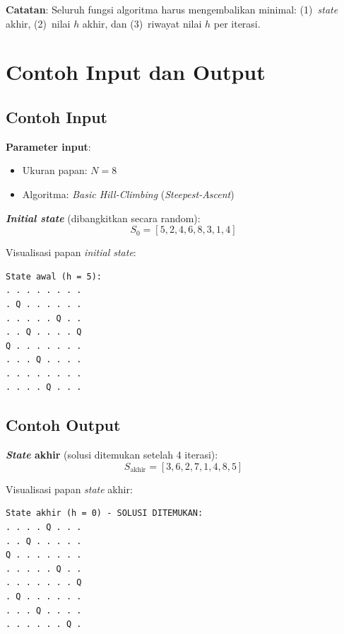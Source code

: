\documentclass[12pt,a4paper]{article}
\begin{document}
\textbf{Catatan}: Seluruh fungsi algoritma harus mengembalikan minimal: (1)~\textit{state} akhir, (2)~nilai $h$ akhir, dan (3)~riwayat nilai $h$ per iterasi.

\section{Contoh Input dan Output}
\label{sec:contoh-io}

\subsection{Contoh Input}
\label{subsec:contoh-input}

\textbf{Parameter input}:
\begin{itemize}
    \item Ukuran papan: $N = 8$
    \item Algoritma: \textit{Basic Hill-Climbing} (\textit{Steepest-Ascent})
\end{itemize}

\textbf{\textit{Initial state}} (dibangkitkan secara random):
\[
    S_0 = [5, 2, 4, 6, 8, 3, 1, 4]
\]

Visualisasi papan \textit{initial state}:
\begin{lstlisting}[language={}, basicstyle=\ttfamily\small, frame=single, caption={Visualisasi \textit{initial state} $S_0 = \lbrack 5, 2, 4, 6, 8, 3, 1, 4 \rbrack$.}]
State awal (h = 5):
. . . . . . . .
. Q . . . . . .
. . . . . Q . .
. . Q . . . . Q
Q . . . . . . .
. . . Q . . . .
. . . . . . . .
. . . . Q . . .
\end{lstlisting}

\subsection{Contoh Output}
\label{subsec:contoh-output}

\textbf{\textit{State} akhir} (solusi ditemukan setelah 4 iterasi):
\[
    S_{\text{akhir}} = [3, 6, 2, 7, 1, 4, 8, 5]
\]

Visualisasi papan \textit{state} akhir:
\begin{lstlisting}[language={}, basicstyle=\ttfamily\small, frame=single, caption={Visualisasi \textit{final state} $S_{akhir} = \lbrack 3, 6, 2, 7, 1, 4, 8, 5 \rbrack$.}]
State akhir (h = 0) - SOLUSI DITEMUKAN:
. . . . Q . . .
. . Q . . . . .
Q . . . . . . .
. . . . . Q . .
. . . . . . . Q
. Q . . . . . .
. . . Q . . . .
. . . . . . Q .
\end{lstlisting}
\end{document}
